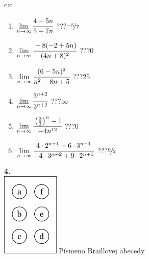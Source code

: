 \documentclass[10pt]{report}
\begin{document}
\begin{tabular}{c:c}
\begin{minipage}[c][104.5mm][t]{0.5\linewidth}
\begin{center}
\begin{minipage}{0.79\linewidth}
\begin{center}
\begin{varwidth}{\linewidth}
\begin{enumerate}
\normalsize
\item $\lim\limits_{n\to\infty}\cfrac{4-5n}{5+7n}$\quad \dotfill\; ???\;\dotfill \quad $\nicefrac{-5}{7}$
\item $\lim\limits_{n\to\infty}\cfrac{-8(-2+5n)}{(4n+8)^2}$\quad \dotfill\; ???\;\dotfill \quad $0$
\item $\lim\limits_{n\to\infty}\cfrac{(6-5n)^2}{n^2-8n+5}$\quad \dotfill\; ???\;\dotfill \quad $25$
\item $\lim\limits_{n\to\infty}\cfrac{3^{n+2}}{3^{n+2}}$\quad \dotfill\; ???\;\dotfill \quad $\infty$
\item $\lim\limits_{n\to\infty}\cfrac{\left(\frac{2}{3}\right)^n -1}{-4n^{12}}$\quad \dotfill\; ???\;\dotfill \quad $0$
\item $\lim\limits_{n\to\infty}\cfrac{4\cdot 2^{n+1}-6\cdot 3^{n-1}}{-4\cdot 3^{n+2}+9\cdot 2^{n+1}}$\quad \dotfill\; ???\;\dotfill \quad $\nicefrac{9}{2}$
\end{enumerate}
\end{varwidth}
\end{center}
\end{minipage}
\begin{minipage}{0.20\linewidth}
\begin{center}
{\Huge\bfseries 4.} \\[2mm]
\includegraphics[height=40mm]{../images/braille.png}
{\small Písmeno Braillovej abecedy}
\end{center}
\end{minipage}
\end{center}
\end{minipage}
%
\end{tabular}
\newpage
\thispagestyle{empty}
\end{document}
